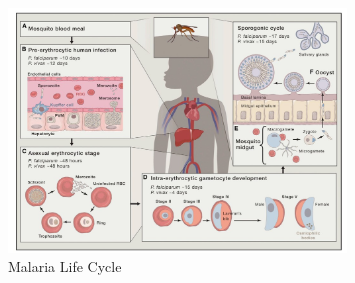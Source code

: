 \documentclass[twoside]{article}
\begin{document}
    \begin{figure}[H]
        \centering
        \includegraphics[width=0.8\textwidth]{malarialifecycle.jpg}
        \caption{Malaria Life Cycle}
        \label{fig: Malaria Life Cycle}
    \end{figure}
\end{document}
